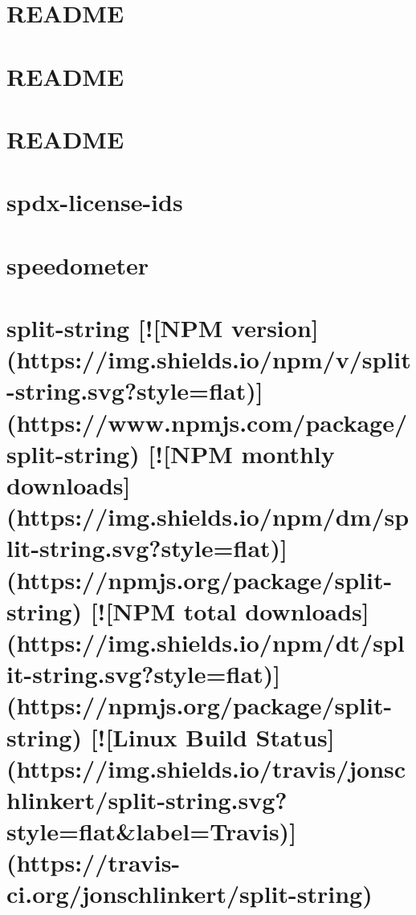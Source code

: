 \documentclass[twoside]{book}
\newcommand{\+}{\discretionary{\mbox{\scriptsize$\hookleftarrow$}}{}{}}
\begin{document}
\chapter{R\+E\+A\+D\+ME}
\label{md_dsmacc_vis_degree_node_modules_spdx-correct_README}

\chapter{R\+E\+A\+D\+ME}
\label{md_dsmacc_vis_degree_node_modules_spdx-exceptions_README}

\chapter{R\+E\+A\+D\+ME}
\label{md_dsmacc_vis_degree_node_modules_spdx-expression-parse_README}

\chapter{spdx-\/license-\/ids}
\label{md_dsmacc_vis_degree_node_modules_spdx-license-ids_README}

\chapter{speedometer}
\label{md_dsmacc_vis_degree_node_modules_speedometer_README}

\chapter{split-\/string \mbox{[}!\mbox{[}N\+PM version\mbox{]}(https\+://img.shields.\+io/npm/v/split-\/string.svg?style=flat)\mbox{]}(https\+://www.npmjs.\+com/package/split-\/string) \mbox{[}!\mbox{[}N\+PM monthly downloads\mbox{]}(https\+://img.shields.\+io/npm/dm/split-\/string.svg?style=flat)\mbox{]}(https\+://npmjs.org/package/split-\/string) \mbox{[}!\mbox{[}N\+PM total downloads\mbox{]}(https\+://img.shields.\+io/npm/dt/split-\/string.svg?style=flat)\mbox{]}(https\+://npmjs.org/package/split-\/string) \mbox{[}!\mbox{[}Linux Build Status\mbox{]}(https\+://img.shields.\+io/travis/jonschlinkert/split-\/string.svg?style=flat\&label=Travis)\mbox{]}(https\+://travis-\/ci.org/jonschlinkert/split-\/string)}
\label{md_dsmacc_vis_degree_node_modules_split-string_README}

\end{document}
